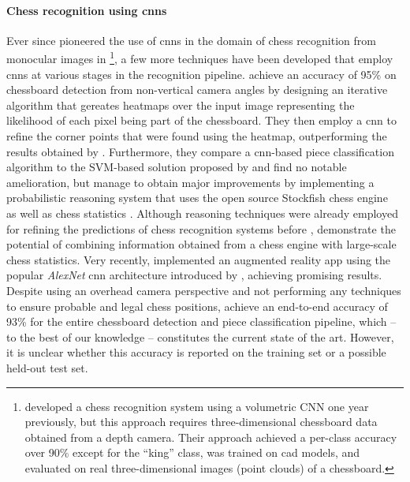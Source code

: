 \paragraph{Chess recognition using \glspl{cnn}}
Ever since \citeauthor{xie2018} pioneered the use of \glspl{cnn} in the domain of chess recognition from monocular images in \citeyear{xie2018}%
\footnote{%
    \textcite{wei2017} developed a chess recognition system using a volumetric CNN one year previously, but this approach requires three-dimensional chessboard data obtained from a depth camera. 
    Their approach achieved a per-class accuracy over 90\% except for the ``king'' class, was trained on \gls{cad} models, and evaluated on real three-dimensional images (point clouds) of a chessboard.
},
a few more techniques have been developed that employ \glspl{cnn} at various stages in the recognition pipeline.
\textcite{czyzewski2020} achieve an accuracy of 95\% on chessboard detection from non-vertical camera angles by designing an iterative algorithm that gereates heatmaps over the input image representing the likelihood of each pixel being part of the chessboard. 
They then employ a \gls{cnn} to refine the corner points that were found using the heatmap, outperforming the results obtained by \textcite{goncalves2005}.
Furthermore, they compare a \gls{cnn}-based piece classification algorithm to the SVM-based solution proposed by \textcite{ding2016} and find no notable amelioration, but manage to obtain major improvements by implementing a probabilistic reasoning system that uses the open source Stockfish chess engine \cite{romstad2020} as well as chess statistics \cite{acher2016}.
Although reasoning techniques were already employed for refining the predictions of chess recognition systems before \cite{neufeld2010,danner2015}, \citeauthor{czyzewski2020} demonstrate the potential of combining information obtained from a chess engine with large-scale chess statistics.  
Very recently, \textcite{mehta2020} implemented an augmented reality app using the popular \emph{AlexNet} \gls{cnn} architecture introduced by \textcite{krizhevsky2017}, achieving promising results.
Despite using an overhead camera perspective and not performing any techniques to ensure probable and legal chess positions, \citeauthor{mehta2020} achieve an end-to-end accuracy of 93\% for the entire chessboard detection and piece classification pipeline, which -- to the best of our knowledge -- constitutes the current state of the art.
However, it is unclear whether this accuracy is reported on the training set or a possible held-out test set.

